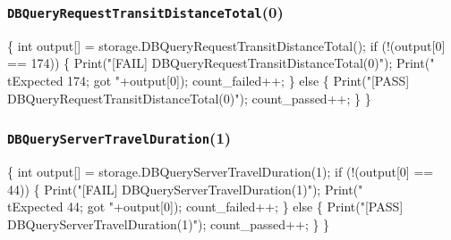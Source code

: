 \documentclass{article}
\def\nwendcode{\endtrivlist \endgroup}
\let\nwdocspar=\par
\theoremstyle{definition}
\begin{document}
\subsubsection{{\tt{}DBQueryRequestTransitDistanceTotal}(0)}
\nwenddocs{}\endmoddef{}
\{
  int output[] = storage.DBQueryRequestTransitDistanceTotal();
  if (!(output[0] == 174)) \{
    Print("[FAIL] DBQueryRequestTransitDistanceTotal(0)");
    Print("\\tExpected 174; got "+output[0]);
    count_failed++;
  \} else \{
    Print("[PASS] DBQueryRequestTransitDistanceTotal(0)");
    count_passed++;
  \}
\}
\nwendcode{}\nwdocspar
\subsubsection{{\tt{}DBQueryServerTravelDuration}(1)}
\nwenddocs{}\endmoddef{}
\{
  int output[] = storage.DBQueryServerTravelDuration(1);
  if (!(output[0] == 44)) \{
    Print("[FAIL] DBQueryServerTravelDuration(1)");
    Print("\\tExpected 44; got "+output[0]);
    count_failed++;
  \} else \{
    Print("[PASS] DBQueryServerTravelDuration(1)");
    count_passed++;
  \}
\}
\nwendcode{}\nwdocspar
\end{document}
